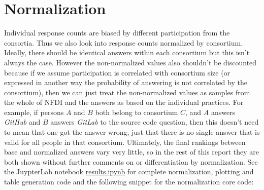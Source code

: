 \documentclass[headsepline,titlepage,twoside,12pt,toc=flat,headings=normal]{scrreprt}
\begin{document}
\newpage
\section{Normalization}
Individual response counts are biased by different participation from the consortia.
Thus we also look into response counts normalized by consortium.
Ideally, there should be identical answers within each consortium but this isn't always the case.
However the non-normalized values also shouldn't be discounted because if we assume participation is correlated with consortium size (or expressed in another way the probability of answering is not correlated by the consortium), then we can just treat the non-normalized values as samples from the whole of NFDI and the answers as based on the individual practices.
For example, if persons $A$ and $B$ both belong to consortium $C$, and $A$ answers \emph{GitHub} and $B$ answers \emph{GitLab} to the source code question, then this doesn't need to mean that one got the answer wrong, just that there is no single answer that is valid for all people in that consortium.
Ultimately, the final rankings between base and normalized answers vary very little, so in the rest of this report they are both shown without further comments on or differentiation by normalization.
See the JuypterLab notebook \href{https://github.com/KonradHoeffner/softwaresurvey/blob/master/results.ipynb}{results.ipynb} for complete normalization, plotting and table generation code and the following snippet for the normalization core code:
\iffalse
\begin{lstlisting}
# if someone has n consortia, count only as 1/n for normalization
# of other cols, requires col_count("consortium","...") first
def cons_count_normalize():
  counts = defaultdict(int)
  for consortia in df["consortium"]:
    for consortium in consortia:
      counts[consortium] += len(consortia)
  return counts
\end{lstlisting}
\fi
\end{document}
